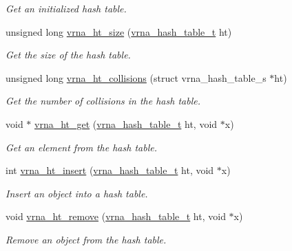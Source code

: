 \begin{DoxyCompactItemize}
\begin{DoxyCompactList}\small\item\em Get an initialized hash table. \end{DoxyCompactList}\item 
unsigned long \mbox{\hyperlink{group__hash__table__utils_ga1d7a50bb20b32275e742ec575966412b}{vrna\+\_\+ht\+\_\+size}} (\mbox{\hyperlink{group__hash__table__utils_gabc7c6f41b718c8e23929e528891a89c4}{vrna\+\_\+hash\+\_\+table\+\_\+t}} ht)
\begin{DoxyCompactList}\small\item\em Get the size of the hash table. \end{DoxyCompactList}\item 
unsigned long \mbox{\hyperlink{group__hash__table__utils_ga928e7a27a9d34d254ce3855f1ab1d190}{vrna\+\_\+ht\+\_\+collisions}} (struct vrna\+\_\+hash\+\_\+table\+\_\+s $\ast$ht)
\begin{DoxyCompactList}\small\item\em Get the number of collisions in the hash table. \end{DoxyCompactList}\item 
void $\ast$ \mbox{\hyperlink{group__hash__table__utils_ga38f124472c8e7e75f067d3b27b43da09}{vrna\+\_\+ht\+\_\+get}} (\mbox{\hyperlink{group__hash__table__utils_gabc7c6f41b718c8e23929e528891a89c4}{vrna\+\_\+hash\+\_\+table\+\_\+t}} ht, void $\ast$x)
\begin{DoxyCompactList}\small\item\em Get an element from the hash table. \end{DoxyCompactList}\item 
int \mbox{\hyperlink{group__hash__table__utils_ga4d2189ce8048f031a15ca5e4b290d494}{vrna\+\_\+ht\+\_\+insert}} (\mbox{\hyperlink{group__hash__table__utils_gabc7c6f41b718c8e23929e528891a89c4}{vrna\+\_\+hash\+\_\+table\+\_\+t}} ht, void $\ast$x)
\begin{DoxyCompactList}\small\item\em Insert an object into a hash table. \end{DoxyCompactList}\item 
void \mbox{\hyperlink{group__hash__table__utils_ga1162aa0d1bd82af7420bb727a87d3e2f}{vrna\+\_\+ht\+\_\+remove}} (\mbox{\hyperlink{group__hash__table__utils_gabc7c6f41b718c8e23929e528891a89c4}{vrna\+\_\+hash\+\_\+table\+\_\+t}} ht, void $\ast$x)
\begin{DoxyCompactList}\small\item\em Remove an object from the hash table. \end{DoxyCompactList}\item 

\end{DoxyCompactItemize}
